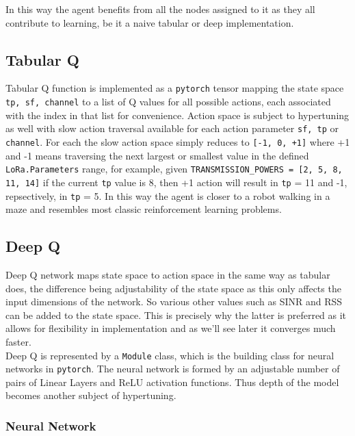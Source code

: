 In this way the agent benefits from all the nodes assigned to 
it as they all contribute to learning, be it a naive tabular or
deep implementation.

\subsection{Tabular Q}
Tabular Q function is implemented as a \texttt{pytorch} 
tensor mapping the state space \texttt{tp, sf, channel} to 
a list of Q values for all possible actions, each associated
with the index in that list for convenience. Action space 
is subject to hypertuning as well with slow action traversal
available for each action parameter \texttt{sf, tp} or 
\texttt{channel}. For each the slow action space simply 
reduces to \texttt{[-1, 0, +1]} where +1 and -1 means traversing 
the next largest or smallest value in the defined \texttt{LoRa.Parameters} range, for example, given 
\texttt{TRANSMISSION\_POWERS = [2, 5, 8, 11, 14]} if the current 
\texttt{tp} value is 8, then +1 action will result in \texttt{tp} = 11 and -1, repsectively, in \texttt{tp} = 5. In this way 
the agent is closer to a robot walking in a maze and resembles 
most classic reinforcement learning problems.

\subsection{Deep Q}
Deep Q network maps state space to action space in the same way
as tabular does, the difference being adjustability of the state
space as this only affects the input dimensions of the network.
So various other values such as SINR and RSS can be added to the 
state space. This is precisely why the latter is preferred 
as it allows for flexibility in implementation and as we'll 
see later it converges much faster. \\

Deep Q is represented by a \texttt{Module} class, which is 
the building class for neural networks in \texttt{pytorch}.
The neural network is formed by an adjustable number of 
pairs of Linear Layers and ReLU activation functions.
Thus depth of the model becomes another subject of 
hypertuning. \\



\subsubsection{Neural Network}

